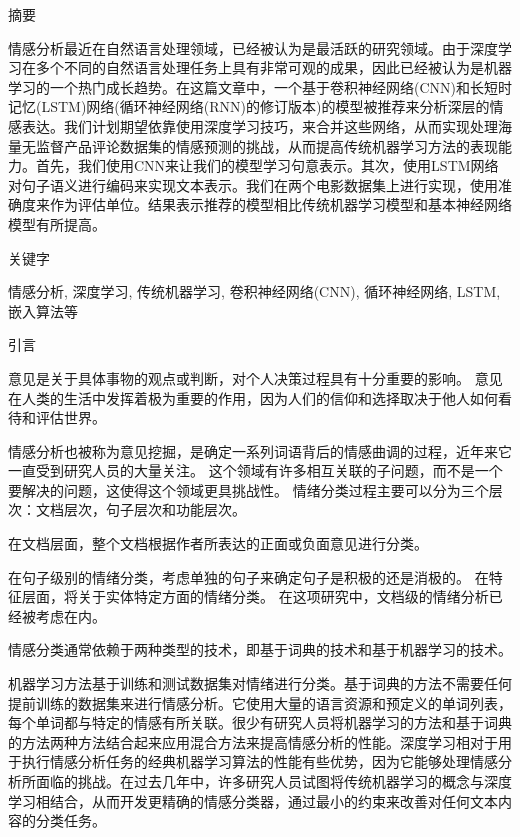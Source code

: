 \documentclass[a4paper,AutoFakeBold,oneside,12pt]{book}
\begin{document}
\songti{}
摘要

情感分析最近在自然语言处理领域，已经被认为是最活跃的研究领域。由于深度学习在多个不同的自然语言处理任务上具有非常可观的成果，因此已经被认为是机器学习的一个热门成长趋势。在这篇文章中，一个基于卷积神经网络(CNN)和长短时记忆(LSTM)网络(循环神经网络(RNN)的修订版本)的模型被推荐来分析深层的情感表达。我们计划期望依靠使用深度学习技巧，来合并这些网络，从而实现处理海量无监督产品评论数据集的情感预测的挑战，从而提高传统机器学习方法的表现能力。首先，我们使用CNN来让我们的模型学习句意表示。其次，使用LSTM网络对句子语义进行编码来实现文本表示。我们在两个电影数据集上进行实现，使用准确度来作为评估单位。结果表示推荐的模型相比传统机器学习模型和基本神经网络模型有所提高。

关键字

情感分析, 深度学习, 传统机器学习, 卷积神经网络(CNN), 循环神经网络, LSTM, 嵌入算法等


引言

意见是关于具体事物的观点或判断，对个人决策过程具有十分重要的影响。 意见在人类的生活中发挥着极为重要的作用，因为人们的信仰和选择取决于他人如何看待和评估世界。

情感分析也被称为意见挖掘，是确定一系列词语背后的情感曲调的过程，近年来它一直受到研究人员的大量关注。 这个领域有许多相互关联的子问题，而不是一个要解决的问题，这使得这个领域更具挑战性。 情绪分类过程主要可以分为三个层次：文档层次，句子层次和功能层次。

在文档层面，整个文档根据作者所表达的正面或负面意见进行分类。

在句子级别的情绪分类，考虑单独的句子来确定句子是积极的还是消极的。 在特征层面，将关于实体特定方面的情绪分类。 在这项研究中，文档级的情绪分析已经被考虑在内。

情感分类通常依赖于两种类型的技术，即基于词典的技术和基于机器学习的技术。

机器学习方法基于训练和测试数据集对情绪进行分类。基于词典的方法不需要任何提前训练的数据集来进行情感分析。它使用大量的语言资源和预定义的单词列表，每个单词都与特定的情感有所关联。很少有研究人员将机器学习的方法和基于词典的方法两种方法结合起来应用混合方法来提高情感分析的性能。深度学习相对于用于执行情感分析任务的经典机器学习算法的性能有些优势，因为它能够处理情感分析所面临的挑战。在过去几年中，许多研究人员试图将传统机器学习的概念与深度学习相结合，从而开发更精确的情感分类器，通过最小的约束来改善对任何文本内容的分类任务。
\end{document}

